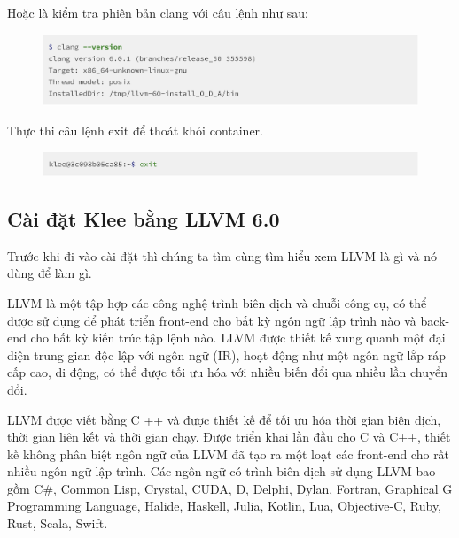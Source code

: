 \documentclass[12pt,a4paper]{report}
\begin{document}
\begin{itemize}
Hoặc là kiểm tra phiên bản clang với câu lệnh như sau:

\begin{figure}[ht]
\begin{center}
\includegraphics[scale=0.3]{hinhanh/clangversion.png}
\end{center}
\end{figure} \newpage

Thực thi câu lệnh exit để thoát khỏi container.

\begin{figure}[htb]
\begin{center}
\includegraphics[scale=.3]{hinhanh/exitcontainer.png}
\end{center}
\end{figure}
\end{itemize}

\subsection{Cài đặt Klee bằng LLVM 6.0}

Trước khi đi vào cài đặt thì chúng ta tìm cùng tìm hiểu xem LLVM là gì và nó dùng để làm gì.

LLVM là một tập hợp các công nghệ trình biên dịch và chuỗi công cụ, có thể được sử dụng để phát triển front-end cho bất kỳ ngôn ngữ lập trình nào và back-end cho bất kỳ kiến trúc tập lệnh nào. LLVM được thiết kế xung quanh một đại diện trung gian độc lập với ngôn ngữ (IR), hoạt động như một ngôn ngữ lắp ráp cấp cao, di động, có thể được tối ưu hóa với nhiều biến đổi qua nhiều lần chuyển đổi.

LLVM được viết bằng C ++ và được thiết kế để tối ưu hóa thời gian biên dịch, thời gian liên kết và thời gian chạy. Được triển khai lần đầu cho C và C++, thiết kế không phân biệt ngôn ngữ của LLVM đã tạo ra một loạt các front-end cho rất nhiều ngôn ngữ lập trình. Các ngôn ngữ có trình biên dịch sử dụng LLVM bao gồm C\#, Common Lisp, Crystal, CUDA, D, Delphi, Dylan, Fortran, Graphical G Programming Language, Halide, Haskell, Julia, Kotlin, Lua, Objective-C, Ruby, Rust, Scala, Swift.
\end{document}

